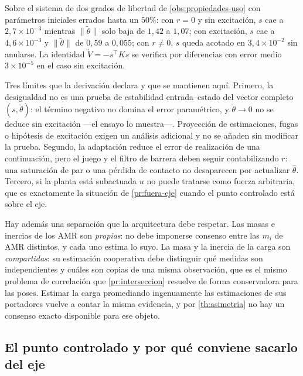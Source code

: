 \begin{observacion}
\label{obs:adaptacion-num}
Sobre el sistema de dos grados de libertad de \cref{obs:propiedades-uso} con
parámetros iniciales errados hasta un $50\%$: con $r=0$ y sin excitación, $s$
cae a $2{,}7\times10^{-3}$ mientras $\lVert\tilde\theta\rVert$ solo baja de
$1{,}42$ a $1{,}07$; con excitación, $s$ cae a $4{,}6\times10^{-3}$ y
$\lVert\tilde\theta\rVert$ de $0{,}59$ a $0{,}055$; con $r\neq0$, $s$ queda
acotado en $3{,}4\times10^{-2}$ sin anularse. La identidad $\dot V=-s^{\!\top}Ks$
se verifica por diferencias con error medio $3\times10^{-5}$ en el caso sin
excitación.

Tres límites que la derivación declara y que se mantienen aquí. Primero, la
desigualdad no es una prueba de estabilidad entrada--estado del vector completo
$(s,\tilde\theta)$: el término negativo no domina el error paramétrico, y
$\tilde\theta\to0$ no se deduce sin excitación —el ensayo lo muestra—. Proyección
de estimaciones, fugas o hipótesis de excitación exigen un análisis adicional y no
se añaden sin modificar la prueba. Segundo, la adaptación reduce el error de
realización de una continuación, pero el juego y el filtro de barrera deben
seguir contabilizando $r$: una saturación de par o una pérdida de contacto no
desaparecen por actualizar $\hat\theta$. Tercero, si la planta está subactuada
$u$ no puede tratarse como fuerza arbitraria, que es exactamente la situación de
\cref{pr:fuera-eje} cuando el punto controlado está sobre el eje.
\end{observacion}

\begin{observacion}
\label{obs:parametros-compartidos}
Hay además una separación que la arquitectura debe respetar. Las masas e inercias
de los AMR son \emph{propias}: no debe imponerse consenso entre las $m_i$ de AMR
distintos, y cada uno estima lo suyo. La masa y la inercia de la carga son
\emph{compartidas}: su estimación cooperativa debe distinguir qué medidas son
independientes y cuáles son copias de una misma observación, que es el mismo
problema de correlación que \cref{pr:interseccion} resuelve de forma conservadora
para las poses. Estimar la carga promediando ingenuamente las estimaciones de
sus portadores vuelve a contar la misma evidencia, y por \cref{th:asimetria} no
hay un consenso exacto disponible para ese objeto.
\end{observacion}

\subsection{El punto controlado y por qué conviene sacarlo del eje}

